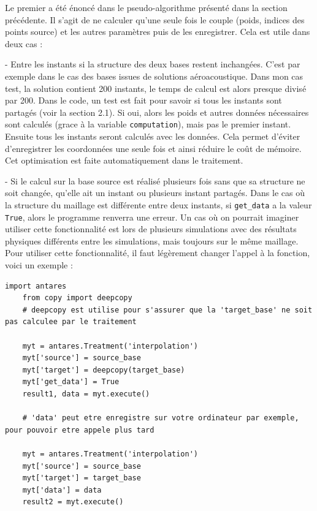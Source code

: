 Le premier a été énoncé dans le pseudo-algorithme présenté dans la section précédente. Il s'agit de ne calculer qu'une seule fois le couple (poids, indices des points source) et les autres paramètres puis de les enregistrer. Cela est utile dans deux cas :

- Entre les instants si la structure des deux bases restent inchangées.
C'est par exemple dans le cas des bases issues de solutions aéroacoustique. Dans mon cas test, la solution contient 200 instants, le temps de calcul est alors presque divisé par 200. Dans le code, un test est fait pour savoir si tous les instants sont partagés (voir la section 2.1). Si oui, alors les poids et autres données nécessaires sont calculés (grace à la variable \texttt{computation}), mais pas le premier instant. Ensuite tous les instants seront calculés avec les données. Cela permet d'éviter d'enregistrer les coordonnées une seule fois et ainsi réduire le coût de mémoire.
Cet optimisation est faite automatiquement dans le traitement.

- Si le calcul sur la base source est réalisé plusieurs fois sans que sa structure ne soit changée, qu'elle ait un instant ou plusieurs instant partagés. Dans le cas où la structure du maillage est différente entre deux instants, si \texttt{get\_data} a la valeur \texttt{True}, alors le programme renverra une erreur.
Un cas où on pourrait imaginer utiliser cette fonctionnalité est lors de plusieurs simulations avec des résultats physiques différents entre les simulations, mais toujours sur le même maillage. Pour utiliser cette fonctionnalité, il faut légèrement changer l'appel à la fonction, voici un exemple :

\begin{lstlisting}[caption=Exemple de réutilisation des données, label={lst:antares}]
    import antares
    from copy import deepcopy
    # deepcopy est utilise pour s'assurer que la 'target_base' ne soit pas calculee par le traitement

    myt = antares.Treatment('interpolation')
    myt['source'] = source_base
    myt['target'] = deepcopy(target_base)
    myt['get_data'] = True
    result1, data = myt.execute()

    # 'data' peut etre enregistre sur votre ordinateur par exemple, pour pouvoir etre appele plus tard

    myt = antares.Treatment('interpolation')
    myt['source'] = source_base
    myt['target'] = target_base
    myt['data'] = data
    result2 = myt.execute()
\end{lstlisting}

